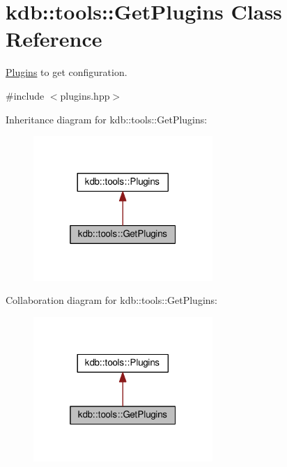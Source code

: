 \hypertarget{classkdb_1_1tools_1_1GetPlugins}{}\section{kdb\+:\+:tools\+:\+:Get\+Plugins Class Reference}
\label{classkdb_1_1tools_1_1GetPlugins}


\hyperlink{classkdb_1_1tools_1_1Plugins}{Plugins} to get configuration.  




{\ttfamily \#include $<$plugins.\+hpp$>$}



Inheritance diagram for kdb\+:\+:tools\+:\+:Get\+Plugins\+:
\nopagebreak
\begin{figure}[H]
\begin{center}
\leavevmode
\includegraphics[width=193pt]{classkdb_1_1tools_1_1GetPlugins__inherit__graph}
\end{center}
\end{figure}


Collaboration diagram for kdb\+:\+:tools\+:\+:Get\+Plugins\+:
\nopagebreak
\begin{figure}[H]
\begin{center}
\leavevmode
\includegraphics[width=193pt]{classkdb_1_1tools_1_1GetPlugins__coll__graph}
\end{center}
\end{figure}
